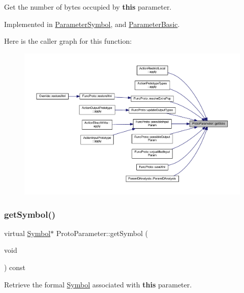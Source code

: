 Get the number of bytes occupied by {\bfseries{this}} parameter. 



Implemented in \mbox{\hyperlink{class_parameter_symbol_a3b5d9b9aabab788511f43446745048c9}{Parameter\+Symbol}}, and \mbox{\hyperlink{class_parameter_basic_a96b3cef1901c8f4b7591551ea7b4d407}{Parameter\+Basic}}.

Here is the caller graph for this function\+:
\nopagebreak
\begin{figure}[H]
\begin{center}
\leavevmode
\includegraphics[width=350pt]{class_proto_parameter_a910cfb9ed6ce57e9bf6e9789b8ed3e0f_icgraph}
\end{center}
\end{figure}
\mbox{\label{class_proto_parameter_afb4a7192eb2e8449b47d85073b3d82e6}} 
\subsubsection{\texorpdfstring{getSymbol()}{getSymbol()}}
{\footnotesize\ttfamily virtual \mbox{\hyperlink{class_symbol}{Symbol}}$\ast$ Proto\+Parameter\+::get\+Symbol (\begin{DoxyParamCaption}\item[{void}]{ }\end{DoxyParamCaption}) const\hspace{0.3cm}{\ttfamily [pure virtual]}}



Retrieve the formal \mbox{\hyperlink{class_symbol}{Symbol}} associated with {\bfseries{this}} parameter. 

